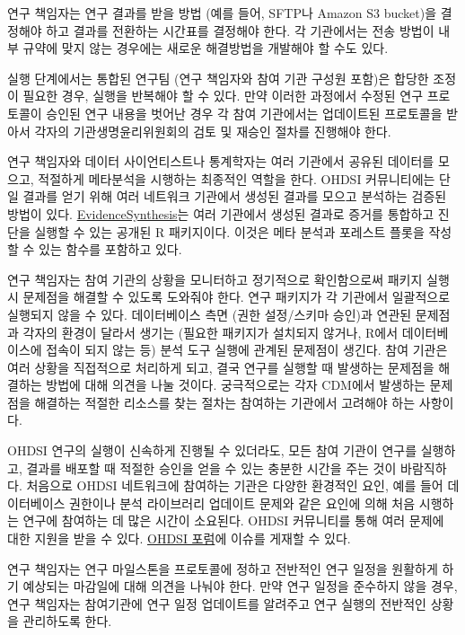\documentclass[10.5pt]{book}
\theoremstyle{definition}
\theoremstyle{definition}
\theoremstyle{definition}
\theoremstyle{remark}
\begin{document}
연구 책임자는 연구 결과를 받을 방법 (예를 들어, SFTP나 Amazon S3
bucket)을 결정해야 하고 결과를 전환하는 시간표를 결정해야 한다. 각
기관에서는 전송 방법이 내부 규약에 맞지 않는 경우에는 새로운 해결방법을
개발해야 할 수도 있다.

실행 단계에서는 통합된 연구팀 (연구 책임자와 참여 기관 구성원 포함)은
합당한 조정이 필요한 경우, 실행을 반복해야 할 수 있다. 만약 이러한
과정에서 수정된 연구 프로토콜이 승인된 연구 내용을 벗어난 경우 각 참여
기관에서는 업데이트된 프로토콜을 받아서 각자의 기관생명윤리위원회의 검토
및 재승인 절차를 진행해야 한다.

연구 책임자와 데이터 사이언티스트나 통계학자는 여러 기관에서 공유된
데이터를 모으고, 적절하게 메타분석을 시행하는 최종적인 역할을 한다.
OHDSI 커뮤니티에는 단일 결과를 얻기 위해 여러 네트워크 기관에서 생성된
결과를 모으고 분석하는 검증된 방법이 있다.
\href{https://github.com/OHDSI/EvidenceSynthesis}{EvidenceSynthesis}는
여러 기관에서 생성된 결과로 증거를 통합하고 진단을 실행할 수 있는 공개된
R 패키지이다. 이것은 메타 분석과 포레스트 플롯을 작성할 수 있는 함수를
포함하고 있다.

연구 책임자는 참여 기관의 상황을 모니터하고 정기적으로 확인함으로써
패키지 실행 시 문제점을 해결할 수 있도록 도와줘야 한다. 연구 패키지가 각
기관에서 일괄적으로 실행되지 않을 수 있다. 데이터베이스 측면 (권한
설정/스키마 승인)과 연관된 문제점과 각자의 환경이 달라서 생기는 (필요한
패키지가 설치되지 않거나, R에서 데이터베이스에 접속이 되지 않는 등) 분석
도구 실행에 관계된 문제점이 생긴다. 참여 기관은 여러 상황을 직접적으로
처리하게 되고, 결국 연구를 실행할 때 발생하는 문제점을 해결하는 방법에
대해 의견을 나눌 것이다. 궁극적으로는 각자 CDM에서 발생하는 문제점을
해결하는 적절한 리소스를 찾는 절차는 참여하는 기관에서 고려해야 하는
사항이다.

OHDSI 연구의 실행이 신속하게 진행될 수 있더라도, 모든 참여 기관이 연구를
실행하고, 결과를 배포할 때 적절한 승인을 얻을 수 있는 충분한 시간을 주는
것이 바람직하다. 처음으로 OHDSI 네트워크에 참여하는 기관은 다양한
환경적인 요인, 예를 들어 데이터베이스 권한이나 분석 라이브러리 업데이트
문제와 같은 요인에 의해 처음 시행하는 연구에 참여하는 데 많은 시간이
소요된다. OHDSI 커뮤니티를 통해 여러 문제에 대한 지원을 받을 수 있다.
\href{http://forums.ohdsi.org}{OHDSI 포럼}에 이슈를 게재할 수 있다.

연구 책임자는 연구 마일스톤을 프로토콜에 정하고 전반적인 연구 일정을
원활하게 하기 예상되는 마감일에 대해 의견을 나눠야 한다. 만약 연구
일정을 준수하지 않을 경우, 연구 책임자는 참여기관에 연구 일정 업데이트를
알려주고 연구 실행의 전반적인 상황을 관리하도록 한다.
\end{document}
